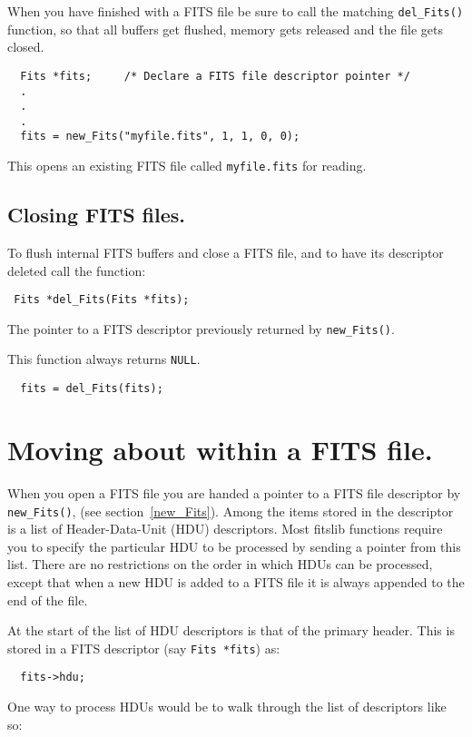 When you have finished with a FITS file be sure to call the matching
\verb`del_Fits()` function, so that all buffers get flushed, memory
gets released and the file gets closed.

\begin{verbatim}
  Fits *fits;     /* Declare a FITS file descriptor pointer */
  .
  .
  .
  fits = new_Fits("myfile.fits", 1, 1, 0, 0);
\end{verbatim}
  This opens an existing FITS file called \verb`myfile.fits` for reading.

\subsection{Closing FITS files.}

To flush internal FITS buffers and close a FITS file, and to have its
descriptor deleted call the function:
\label{del_Fits}\begin{verbatim}
 Fits *del_Fits(Fits *fits);
\end{verbatim}
\begin{arglist}
  The pointer to a FITS descriptor previously returned by
           \verb`new_Fits()`.
\end{arglist}
  This function always returns \verb`NULL`.

\begin{verbatim}
  fits = del_Fits(fits);
\end{verbatim}


\section{Moving about within a FITS file.}

When you open a FITS file you are handed a pointer to a FITS file
descriptor by \verb`new_Fits()`, (see section~\ref{new_Fits}). Among
the items stored in the descriptor is a list of Header-Data-Unit (HDU)
descriptors.  Most fitslib functions require you to specify the
particular HDU to be processed by sending a pointer from this list.
There are no restrictions on the order in which HDUs can be processed,
except that when a new HDU is added to a FITS file it is always
appended to the end of the file.

At the start of the list of HDU descriptors is that of the primary
header. This is stored in a FITS descriptor (say \verb`Fits *fits`)
as:

\begin{verbatim}
  fits->hdu;
\end{verbatim}
One way to process HDUs would be to walk through the list of
descriptors like so:

